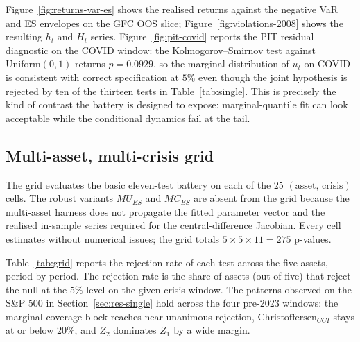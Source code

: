 \documentclass[11pt,a4paper]{article}
\theoremstyle{plain}
\begin{document}
Figure~\ref{fig:returns-var-es} shows the realised returns against
the negative VaR and ES envelopes on the GFC OOS slice;
Figure~\ref{fig:violations-2008} shows the resulting $h_t$ and $H_t$
series. Figure~\ref{fig:pit-covid} reports the PIT residual
diagnostic on the COVID window: the Kolmogorov--Smirnov test against
$\mathrm{Uniform}(0,1)$ returns $p = 0.0929$, so the marginal distribution
of $u_t$ on COVID is consistent with correct specification at $5\%$
even though the joint hypothesis is rejected by ten of the thirteen
tests in Table~\ref{tab:single}. This is precisely the kind of
contrast the battery is designed to expose: marginal-quantile fit can
look acceptable while the conditional dynamics fail at the tail.

\subsection{Multi-asset, multi-crisis grid}
\label{sec:res-grid}

The grid evaluates the basic eleven-test battery on each of the $25$
$(\mathrm{asset},\,\mathrm{crisis})$ cells. The robust variants
$MU_{ES}$ and $MC_{ES}$ are absent from the grid because the
multi-asset harness does not propagate the fitted parameter vector and
the realised in-sample series required for the central-difference
Jacobian. Every cell estimates without numerical issues; the grid
totals $5 \times 5 \times 11 = 275$ p-values.

Table~\ref{tab:grid} reports the rejection rate of each test across
the five assets, period by period. The rejection rate is the share of
assets (out of five) that reject the null at the $5\%$ level on the
given crisis window. The patterns observed on the S\&P 500 in
Section~\ref{sec:res-single} hold across the four pre-2023 windows:
the marginal-coverage block reaches near-unanimous rejection,
$\mathrm{Christoffersen}_{CCI}$ stays at or below $20\%$, and $Z_2$
dominates $Z_1$ by a wide margin.
\end{document}
